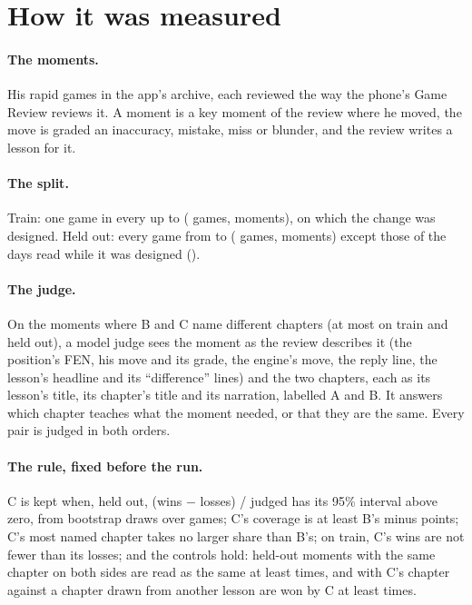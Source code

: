 \documentclass[11pt]{article}
\begin{document}
\section{How it was measured}

\paragraph{The moments.} His rapid games in the app's archive, each reviewed the way the phone's
Game Review reviews it. A moment is a key moment of the review where he moved, the move is graded
an inaccuracy, mistake, miss or blunder, and the review writes a lesson for it.

\paragraph{The split.} Train: one game in every \TrainEvery{} up to \TrainUntil{} (\TrainGames{}
games, \TrainMoments{} moments), on which the change was designed. Held out: every game from
\HeldFrom{} to \HeldUntil{} (\HeldGames{} games, \HeldMoments{} moments) except those of the
\InspectedN{} days read while it was designed (\Inspected).

\paragraph{The judge.} On the moments where B and C name different chapters (at most
\JudgeTrain{} on train and \JudgeHeld{} held out), a model judge sees the moment as the review
describes it (the position's FEN, his move and its grade, the engine's move, the reply line, the
lesson's headline and its ``difference'' lines) and the two chapters, each as its lesson's title,
its chapter's title and its narration, labelled A and B. It answers which chapter teaches what
the moment needed, or that they are the same. Every pair is judged in both orders.

\paragraph{The rule, fixed before the run.} C is kept when, held out, (wins $-$ losses) / judged
has its 95\% interval above zero, from \Draws{} bootstrap draws over games; C's coverage is at
least B's minus \CoverageSlack{} points; C's most named chapter takes no larger share than B's;
on train, C's wins are not fewer than its losses; and the controls hold: \Controls{} held-out
moments with the same chapter on both sides are read as the same at least \SameBar{} times, and
\Controls{} with C's chapter against a chapter drawn from another lesson are won by C at least
\DecoyBar{} times.
\end{document}
